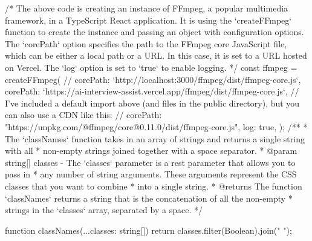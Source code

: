 /* The above code is creating an instance of FFmpeg, a popular multimedia framework, in a TypeScript
React application. It is using the `createFFmpeg` function to create the instance and passing an
object with configuration options. The `corePath` option specifies the path to the FFmpeg core
JavaScript file, which can be either a local path or a URL. In this case, it is set to a URL hosted
on Vercel. The `log` option is set to `true` to enable logging. */
const ffmpeg = createFFmpeg({
  // corePath: `http://localhost:3000/ffmpeg/dist/ffmpeg-core.js`,
  corePath: `https://ai-interview-assist.vercel.app/ffmpeg/dist/ffmpeg-core.js`,
  // I've included a default import above (and files in the public directory), but you can also use a CDN like this:
  // corePath: "https://unpkg.com/@ffmpeg/core@0.11.0/dist/ffmpeg-core.js",
  log: true,
});
/**
 * The `classNames` function takes in an array of strings and returns a single string with all
 * non-empty strings joined together with a space separator.
 * @param {string[]} classes - The `classes` parameter is a rest parameter that allows you to pass in
 * any number of string arguments. These arguments represent the CSS classes that you want to combine
 * into a single string.
 * @returns The function `classNames` returns a string that is the concatenation of all the non-empty
 * strings in the `classes` array, separated by a space.
 */

function classNames(...classes: string[]) {
  return classes.filter(Boolean).join(" ");
}

